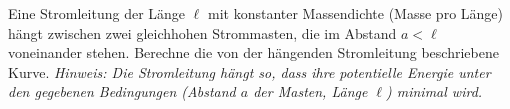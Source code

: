 \begin{prob}
Eine Stromleitung der L\"ange $\ell$ mit konstanter Massendichte
(Masse pro L\"ange) h\"angt zwischen zwei gleichhohen Strommasten, die
im Abstand $a<\ell$ voneinander stehen. Berechne die von der
h\"angenden Stromleitung beschriebene Kurve. 
{\em Hinweis: Die Stromleitung h\"angt so, dass ihre potentielle
  Energie unter den gegebenen Bedingungen (Abstand $a$ der Masten,
  L\"ange $\ell$) minimal wird.}
\end{prob}
